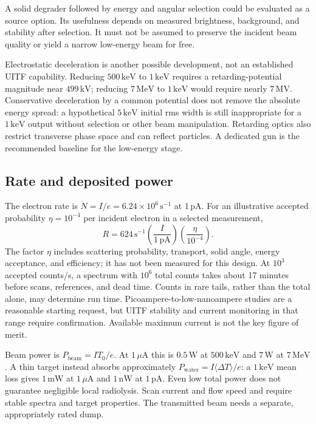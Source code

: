 \documentclass[11pt,letterpaper]{article}
\newcommand{\keV}{\,\mathrm{keV}}
\newcommand{\MeV}{\,\mathrm{MeV}}
\begin{document}
A solid degrader followed by energy and angular selection could be evaluated as a source option.
Its usefulness depends on measured brightness, background, and stability after selection. It must
not be assumed to preserve the incident beam quality or yield a narrow low-energy beam for free.

Electrostatic deceleration is another possible development, not an established UITF capability.
Reducing $500\keV$ to $1\keV$ requires a retarding-potential magnitude near $499\,\mathrm{kV}$;
reducing $7\MeV$ to $1\keV$ would require nearly $7\,\mathrm{MV}$. Conservative deceleration by a
common potential does not remove the absolute energy spread: a hypothetical $5\keV$ initial rms
width is still inappropriate for a $1\keV$ output without selection or other beam manipulation.
Retarding optics also restrict transverse phase space and can reflect particles. A dedicated gun is
the recommended baseline for the low-energy stage.

\subsection{Rate and deposited power}

The electron rate is $\dot N=I/e=6.24\times10^6\,\mathrm{s^{-1}}$ at $1\,\mathrm{pA}$. For an
illustrative accepted probability $\eta=10^{-4}$ per incident electron in a selected measurement,
\begin{equation}
  R=624\,\mathrm{s^{-1}}
    \left(\frac{I}{1\,\mathrm{pA}}\right)
    \left(\frac{\eta}{10^{-4}}\right).
\end{equation}
The factor $\eta$ includes scattering probability, transport, solid angle, energy acceptance, and
efficiency; it has not been measured for this design. At $10^3$ accepted counts/s, a spectrum with
$10^6$ total counts takes about 17 minutes before scans, references, and dead time. Counts in rare
tails, rather than the total alone, may determine run time. Picoampere-to-low-nanoampere studies
are a reasonable starting request, but UITF stability and current monitoring in that range require
confirmation. Available maximum current is not the key figure of merit.

Beam power is $P_{\mathrm{beam}}=I T_0/e$. At $1\,\mu\mathrm{A}$ this is $0.5\,\mathrm{W}$ at
$500\keV$ and $7\,\mathrm{W}$ at $7\MeV$. A thin target instead absorbs approximately
$P_{\mathrm{water}}=I\langle\Delta T\rangle/e$: a $1\keV$ mean loss gives $1\,\mathrm{mW}$ at
$1\,\mu\mathrm{A}$ and $1\,\mathrm{nW}$ at $1\,\mathrm{pA}$. Even low total power does not
guarantee negligible local radiolysis. Scan current and flow speed and require stable spectra and
target properties. The transmitted beam needs a separate, appropriately rated dump.
\end{document}
